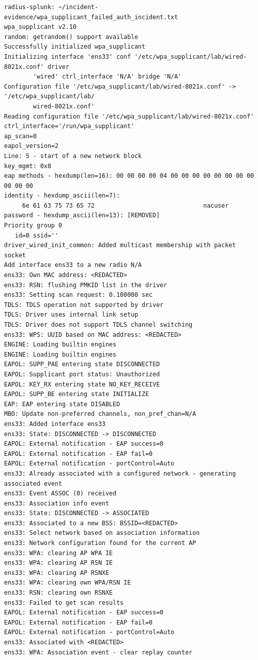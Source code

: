 \documentclass[11pt]{article}
\begin{document}
\begin{verbatim}
radius-splunk: ~/incident-evidence/wpa_supplicant_failed_auth_incident.txt
wpa_supplicant v2.10
random: getrandom() support available
Successfully initialized wpa_supplicant
Initializing interface 'ens33' conf '/etc/wpa_supplicant/lab/wired-8021x.conf' driver 
        'wired' ctrl_interface 'N/A' bridge 'N/A'
Configuration file '/etc/wpa_supplicant/lab/wired-8021x.conf' -> '/etc/wpa_supplicant/lab/
        wired-8021x.conf'
Reading configuration file '/etc/wpa_supplicant/lab/wired-8021x.conf'
ctrl_interface='/run/wpa_supplicant'
ap_scan=0
eapol_version=2
Line: 5 - start of a new network block
key_mgmt: 0x8
eap methods - hexdump(len=16): 00 00 00 00 04 00 00 00 00 00 00 00 00 00 00 00
identity - hexdump_ascii(len=7):
     6e 61 63 75 73 65 72                              nacuser         
password - hexdump_ascii(len=13): [REMOVED]
Priority group 0
   id=0 ssid=''
driver_wired_init_common: Added multicast membership with packet socket
Add interface ens33 to a new radio N/A
ens33: Own MAC address: <REDACTED>
ens33: RSN: flushing PMKID list in the driver
ens33: Setting scan request: 0.100000 sec
TDLS: TDLS operation not supported by driver
TDLS: Driver uses internal link setup
TDLS: Driver does not support TDLS channel switching
ens33: WPS: UUID based on MAC address: <REDACTED>
ENGINE: Loading builtin engines
ENGINE: Loading builtin engines
EAPOL: SUPP_PAE entering state DISCONNECTED
EAPOL: Supplicant port status: Unauthorized
EAPOL: KEY_RX entering state NO_KEY_RECEIVE
EAPOL: SUPP_BE entering state INITIALIZE
EAP: EAP entering state DISABLED
MBO: Update non-preferred channels, non_pref_chan=N/A
ens33: Added interface ens33
ens33: State: DISCONNECTED -> DISCONNECTED
EAPOL: External notification - EAP success=0
EAPOL: External notification - EAP fail=0
EAPOL: External notification - portControl=Auto
ens33: Already associated with a configured network - generating associated event
ens33: Event ASSOC (0) received
ens33: Association info event
ens33: State: DISCONNECTED -> ASSOCIATED
ens33: Associated to a new BSS: BSSID=<REDACTED>
ens33: Select network based on association information
ens33: Network configuration found for the current AP
ens33: WPA: clearing AP WPA IE
ens33: WPA: clearing AP RSN IE
ens33: WPA: clearing AP RSNXE
ens33: WPA: clearing own WPA/RSN IE
ens33: RSN: clearing own RSNXE
ens33: Failed to get scan results
EAPOL: External notification - EAP success=0
EAPOL: External notification - EAP fail=0
EAPOL: External notification - portControl=Auto
ens33: Associated with <REDACTED>
ens33: WPA: Association event - clear replay counter

\end{verbatim}
\end{document}
